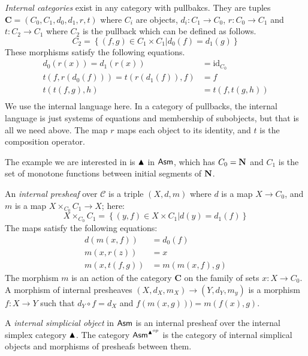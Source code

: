 \documentclass{amsart}
\theoremstyle{plain}
\theoremstyle{definition}
\newcommand\hide[1]{}
\newcommand\cat\mathcal
\newcommand\set[1]{\left\{#1\right\}}
\newcommand\id{\mathrm{id}}
\begin{document}
\newcommand\intcat{\mathbf}
\emph{Internal categories} exist in any category with pullbakcs. They are tuples $\intcat C=(C_0,C_1,d_0,d_1,r,t)$ where $C_i$ are objects, $d_i:C_1\to C_0$, $r:C_0\to C_1$ and $t:C_2\to C_1$ where $C_2$ is the pullback which can be defined as follows. %
\[ C_2 = \set{(f,g)\in C_1\times C_1| d_0(f)=d_1(g) } \]
These morphisms satisfy the following equations.
\begin{align*}
d_0(r(x)) = d_1(r(x)) &= \id_{C_0}\\
t(f, r(d_0(f))) = t(r(d_1(f)),f) &= f\\
t(t(f,g),h) &= t(f,t(g,h))\\
\end{align*}
We use the internal language here. In a category of pullbacks, the internal language is just systems of equations and membership of subobjects, but that is all we need above. The map $r$ maps each object to its identity, and $t$ is the composition operator.

The example we are interested in is $\blacktriangle$ in $\mathsf{Asm}$, which has $C_0 = \mathbf{N}$ and $C_1$ is the set of monotone functions between initial segments of $\mathbf{N}$. 

\hide{ waar gebruiken we deze? }

An \emph{internal presheaf} over $\cat C$ is a triple $(X,d,m)$ where $d$ is a map $X\to C_0$, and $m$ is a map $X\times_{C_0} C_1 \to X$; here:
\[ X\times_{C_0} C_1 = \set{(y,f)\in X\times C_1| d(y) = d_1(f)} \]
The maps satisfy the following equations:
\begin{align*}
d(m(x,f)) &= d_0(f) \\
m(x,r(z)) &= x\\
m(x,t(f,g)) &= m(m(x,f),g)
\end{align*}
The morphism $m$ is an action of the category $\intcat C$ on the family of sets $x:X\to C_0$.
A morphism of internal presheaves $(X,d_X,m_X) \to (Y,d_Y,m_y)$ is a morphism $f:X\to Y$ such that $d_Y\circ f = d_X$ and $f(m(x,g))) = m(f(x),g)$.

A \emph{internal simplicial object} in $\mathsf{Asm}$ is an internal presheaf over the internal simplex category $\blacktriangle$. The category $\mathsf{Asm}^{\blacktriangle^{op}}$ is the category of internal simplical objects and morphisms of presheafs between them.
\end{document}
